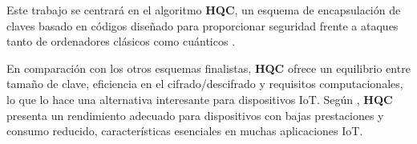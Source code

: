 Este trabajo se centrará en el algoritmo \textbf{HQC}, un esquema de encapsulación de claves basado 
en códigos diseñado para proporcionar seguridad frente a ataques tanto de ordenadores clásicos como 
cuánticos \cite{noauthor_hqc_nodate-1}. 

En comparación con los otros esquemas finalistas, \textbf{HQC} 
ofrece un equilibrio entre tamaño de clave, eficiencia en el cifrado/descifrado y requisitos computacionales, 
lo que lo hace una alternativa interesante para dispositivos IoT. Según \cite{kuznetsov_trade-offs_nodate}, 
\textbf{HQC} presenta un rendimiento adecuado para dispositivos con bajas prestaciones y consumo reducido, 
características esenciales en muchas aplicaciones IoT.%